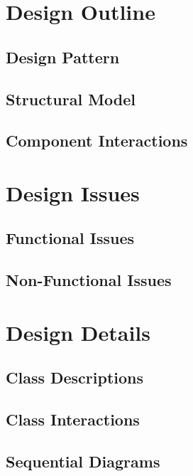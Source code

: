 \documentclass[12pt]{article}
\begin{document}
\section{Design Outline}

\subsection{Design Pattern}


\subsection{Structural Model}


\subsection{Component Interactions}



\section{Design Issues}

\subsection{Functional Issues}


\subsection{Non-Functional Issues}


\section{Design Details}

\subsection{Class Descriptions}


\subsection{Class Interactions}


\subsection{Sequential Diagrams}

\end{document}
